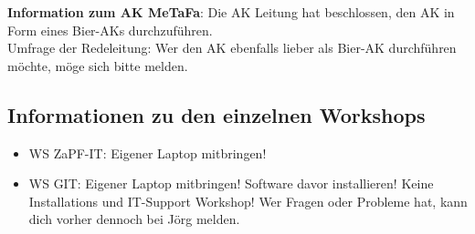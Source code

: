     \textbf{Information zum AK MeTaFa}: Die AK Leitung hat beschlossen, den AK in Form eines Bier-AKs durchzuführen. \\
      Umfrage der Redeleitung: Wer den AK ebenfalls lieber als Bier-AK durchführen möchte, möge sich bitte melden.

    \subsection{Informationen zu den einzelnen Workshops}
      \begin{itemize}
        \item WS ZaPF-IT: Eigener Laptop mitbringen!
        \item WS GIT: Eigener Laptop mitbringen! Software davor installieren! Keine Installations und IT-Support Workshop! Wer Fragen oder Probleme hat, kann dich vorher dennoch bei Jörg melden.
      \end{itemize}

